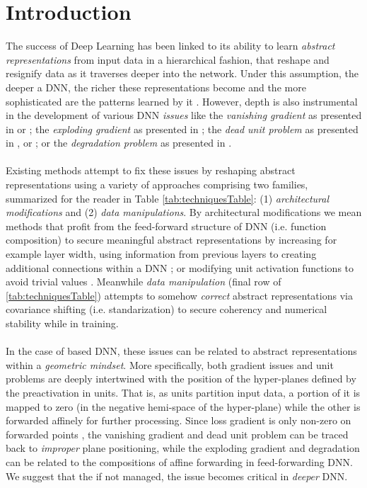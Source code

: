 \section{Introduction}\label{sec:introduction}
The success of Deep Learning has been linked to its ability to learn \emph{abstract representations} from input data in a hierarchical fashion, that reshape and resignify data as it traverses deeper into the network. Under this assumption, the deeper a DNN, the richer these representations become and the more sophisticated are the patterns learned by it \cite{LeCun06atutorial,ramachandranEtAl2017SearchingForActivationFunctions}. However, depth is also instrumental in the development of various DNN \emph{issues} like the \emph{vanishing gradient} as presented in \cite{vanishing1} or \cite{vanishing2}; the \emph{exploding gradient} as presented in \cite{exploding}; the \emph{dead unit problem} as presented in \cite{leaky},\cite{whyreludie} or \cite{whenneuronsfail}; or the \emph{degradation problem} as presented in \cite{resnet}. 
\\\\
Existing methods attempt to fix these issues by reshaping abstract representations using a variety of approaches   comprising two families, summarized for the reader in Table \ref{tab:techniquesTable}: (1) \emph{architectural modifications} and (2) \emph{data manipulations}. By architectural modifications we mean methods that profit from the feed-forward structure of DNN (i.e. function composition) to secure meaningful abstract representations by increasing for example layer width, using information from previous layers to creating additional connections within a DNN \cite{resnet,densenet}; or modifying unit activation functions to avoid trivial values \cite{crelu}. Meanwhile \emph{data manipulation} (final row of \ref{tab:techniquesTable}) attempts to somehow \emph{correct} abstract representations via covariance shifting (i.e. standarization) \cite{batchnorm} to secure coherency and numerical stability while in training. 
\\\\
In the case of \ReLU based DNN, these issues can be related to abstract representations within a \emph{geometric mindset}. More specifically, both gradient issues and unit problems are deeply intertwined with the position of the hyper-planes defined by the preactivation in \ReLU units. That is, as units partition input data, a portion of it is mapped to zero (in the negative hemi-space of the hyper-plane) while the other is forwarded affinely for further processing. Since loss gradient is only non-zero on forwarded points \cite{reyRiera2019ModellingClassificationReLU}, the vanishing gradient and dead unit problem can be traced back to \emph{improper} plane positioning, while the exploding gradient and degradation can be related to the compositions of affine forwarding in feed-forwarding DNN. We suggest that the if not managed, the issue becomes critical in \emph{deeper} DNN.   
